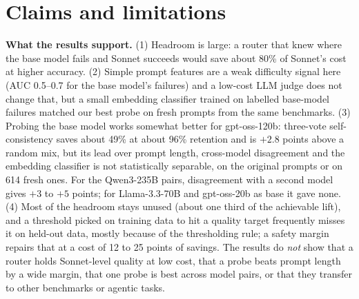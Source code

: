 \documentclass[11pt]{article}
\begin{document}
\section{Claims and limitations}
\textbf{What the results support.} (1) Headroom is large: a router that knew where the base model fails and Sonnet succeeds would save about 80\% of Sonnet's cost at higher accuracy. (2) Simple prompt features are a weak difficulty signal here (AUC 0.5--0.7 for the base model's failures) and a low-cost LLM judge does not change that, but a small embedding classifier trained on labelled base-model failures matched our best probe on fresh prompts from the same benchmarks. (3) Probing the base model works somewhat better for gpt-oss-120b: three-vote self-consistency saves about 49\% at about 96\% retention and is $+2.8$ points above a random mix, but its lead over prompt length, cross-model disagreement and the embedding classifier is not statistically separable, on the original prompts or on 614 fresh ones. For the Qwen3-235B pairs, disagreement with a second model gives $+3$ to $+5$ points; for Llama-3.3-70B and gpt-oss-20b as base it gave none. (4) Most of the headroom stays unused (about one third of the achievable lift), and a threshold picked on training data to hit a quality target frequently misses it on held-out data, mostly because of the thresholding rule; a safety margin repairs that at a cost of 12 to 25 points of savings. The results do \emph{not} show that a router holds Sonnet-level quality at low cost, that a probe beats prompt length by a wide margin, that one probe is best across model pairs, or that they transfer to other benchmarks or agentic tasks.
\end{document}
